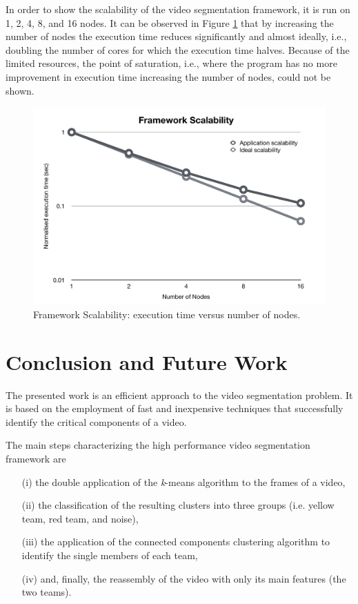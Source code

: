 \documentclass{usiinftr}
\begin{document}
In order to show the scalability of the video segmentation framework, it is run on 1, 2, 4, 8, and 16 nodes. It can be observed in Figure \ref{fig:9} that by increasing the number of nodes the execution time reduces significantly and almost ideally, i.e., doubling the number of cores for which the execution time halves. Because of the limited resources, the point of saturation, i.e., where the program has no more improvement in execution time increasing the number of nodes, could not be shown.

\begin{figure}[h]
	\centering
	\includegraphics[width=0.8\linewidth]{img/scalability}
	\caption{Framework Scalability: execution time versus number of nodes.}
	\label{fig:9}
\end{figure}

\section{Conclusion and Future Work }
The presented work is an efficient approach to the video segmentation problem. It is based on the employment of fast and inexpensive techniques that successfully identify the critical components of a video.

The main steps characterizing the high performance video segmentation framework are 
\begin{itemize}
	\item[(i)] the double application of the \textit{k}-means algorithm to the frames of a video, 
	\item[(ii)] the classification of the resulting clusters into three groups (i.e. yellow team, red team, and noise), 
	\item[(iii)] the application of the connected components clustering algorithm to identify the single members of each team,
	\item[(iv)] and, finally, the reassembly of the video with only its main features (the two teams).
\end{itemize}
\end{document}
